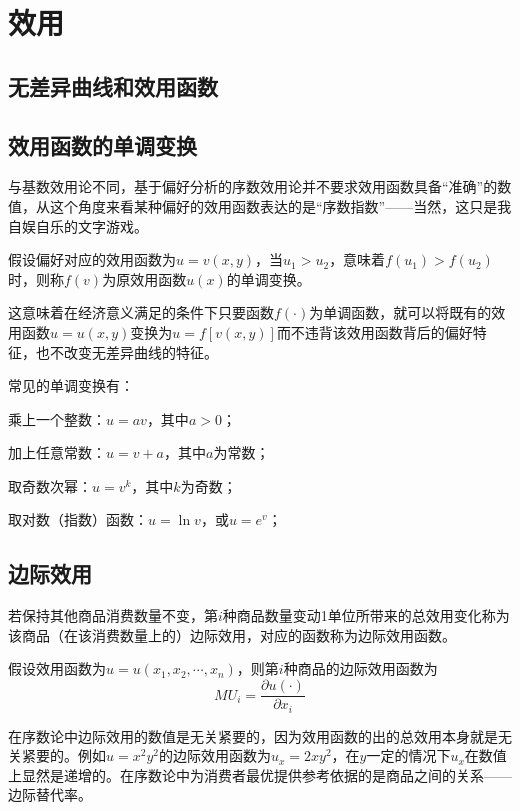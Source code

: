 \chapter{效用}
\label{chp:utility}

\section{无差异曲线和效用函数}%

\section{效用函数的单调变换}%
与基数效用论不同，基于偏好分析的序数效用论并不要求效用函数具备“准确”的数值，从这个角度来看某种偏好的效用函数表达的是“序数指数”——当然，这只是我自娱自乐的文字游戏。

假设偏好对应的效用函数为$u=v(x,y)$，当$u_1>u_2$，意味着$f(u_1)>f(u_2)$时，则称$f(v)$为原效用函数$u(x)$的单调变换。

这意味着在经济意义满足的条件下只要函数$f(\cdot)$为单调函数，就可以将既有的效用函数$u=u(x,y)$变换为$u=f[v(x,y)]$而不违背该效用函数背后的偏好特征，也不改变无差异曲线的特征。

常见的单调变换有：
\begin{compactitem}
\item 乘上一个整数：$u=av$，其中$a>0$；
\item 加上任意常数：$u=v+a$，其中$a$为常数；
\item 取奇数次幂：$u=v^k$，其中$k$为奇数；
\item 取对数（指数）函数：$u=\ln v$，或$u=e^v$；
\end{compactitem}

\section{边际效用}
若保持其他商品消费数量不变，第$i$种商品数量变动1单位所带来的总效用变化称为该商品（在该消费数量上的）边际效用，对应的函数称为边际效用函数。

假设效用函数为$u=u(x_1,x_2,\cdots,x_n)$，则第$i$种商品的边际效用函数为
\begin{equation}
MU_i=\frac{\partial u(\cdot)}{\partial x_i}
\label{eq:marginal-utility-function}
\end{equation}

在序数论中边际效用的数值是无关紧要的，因为效用函数的出的总效用本身就是无关紧要的。例如$u=x^2y^2$的边际效用函数为$u_x=2xy^2$，在$y$一定的情况下$u_x$在数值上显然是递增的。在序数论中为消费者最优提供参考依据的是商品之间的关系——边际替代率。

